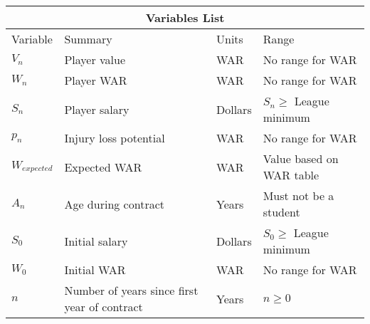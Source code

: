 \documentclass[12pt]{article}
\begin{document}
\begin{center}
\begin{tabular}{ |p{1.5cm}||p{5cm}||p{1.5cm}||p{5cm}|  }
\hline
\multicolumn{4}{|c|}{Variables List} \\
\hline
Variable  & Summary & Units & Range\\
\hline
$V_n$  & Player value  & WAR &   No range for WAR\\
\hline
$W_n$ &   Player WAR & WAR & No range for WAR\\
\hline
$S_n$ & Player salary & Dollars & $S_n \geq$ League minimum \\
\hline
$p_n$  & Injury loss potential & WAR & No range for WAR\\
\hline
$W_{expected}$ & Expected WAR & WAR & Value based on WAR table\\
 \hline
 $A_n$ & Age during contract & Years & Must not be a student \\
 \hline
  $S_{0}$ & Initial salary & Dollars & $S_0 \geq$ League minimum \\
 \hline
   $W_{0}$ & Initial WAR & WAR & No range for WAR \\
 \hline
    $n$ & Number of years since first year of contract & Years & $n \geq 0$ \\
 \hline
\end{tabular}
\end{center}
\end{document}
